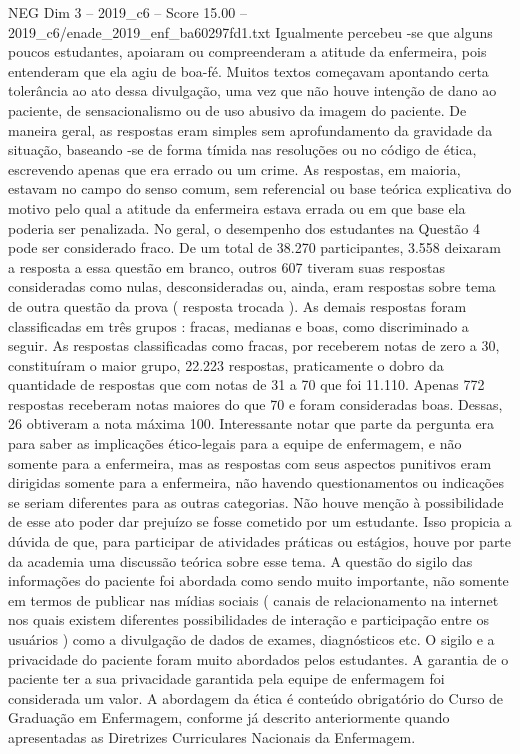 \begin{textsample}{NEG Dim 3 – 2019\_c6 – Score 15.00 – 2019\_c6/enade\_2019\_enf\_ba60297fd1.txt}
Igualmente percebeu -se que alguns poucos estudantes, apoiaram ou compreenderam a atitude da enfermeira, pois entenderam que ela agiu de boa-fé.
Muitos textos começavam apontando certa tolerância ao ato dessa divulgação, uma vez que não houve intenção de dano ao paciente, de sensacionalismo ou de uso abusivo da imagem do paciente.
De maneira geral, as respostas eram simples sem aprofundamento da gravidade da situação, baseando -se de forma tímida nas resoluções ou no código de ética, escrevendo apenas que era errado ou um crime.
As respostas, em maioria, estavam no campo do senso comum, sem referencial ou base teórica explicativa do motivo pelo qual a atitude da enfermeira estava errada ou em que base ela poderia ser penalizada.
No geral, o desempenho dos estudantes na Questão 4 pode ser considerado fraco.
De um total de 38.270 participantes, 3.558 deixaram a resposta a essa questão em branco, outros 607 tiveram suas respostas consideradas como nulas, desconsideradas ou, ainda, eram respostas sobre tema de outra questão da prova ( resposta trocada ).
As demais respostas foram classificadas em três grupos : fracas, medianas e boas, como discriminado a seguir.
As respostas classificadas como fracas, por receberem notas de zero a 30, constituíram o maior grupo, 22.223 respostas, praticamente o dobro da quantidade de respostas que com notas de 31 a 70 que foi 11.110.
Apenas 772 respostas receberam notas maiores do que 70 e foram consideradas boas.
Dessas, 26 obtiveram a nota máxima 100.
Interessante notar que parte da pergunta era para saber as implicações ético-legais para a equipe de enfermagem, e não somente para a enfermeira, mas as respostas com seus aspectos punitivos eram dirigidas somente para a enfermeira, não havendo questionamentos ou indicações se seriam diferentes para as outras categorias.
Não houve menção à possibilidade de esse ato poder dar prejuízo se fosse cometido por um estudante.
Isso propicia a dúvida de que, para participar de atividades práticas ou estágios, houve por parte da academia uma discussão teórica sobre esse tema.
A questão do sigilo das informações do paciente foi abordada como sendo muito importante, não somente em termos de publicar nas mídias sociais ( canais de relacionamento na internet nos quais existem diferentes possibilidades de interação e participação entre os usuários ) como a divulgação de dados de exames, diagnósticos etc.
O sigilo e a privacidade do paciente foram muito abordados pelos estudantes.
A garantia de o paciente ter a sua privacidade garantida pela equipe de enfermagem foi considerada um valor.
A abordagem da ética é conteúdo obrigatório do Curso de Graduação em Enfermagem, conforme já descrito anteriormente quando apresentadas as Diretrizes Curriculares Nacionais da Enfermagem.

\end{textsample}
